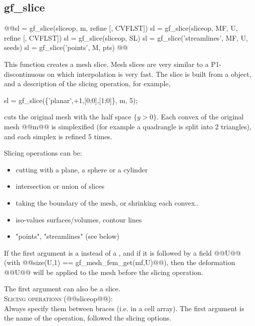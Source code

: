 \subsection{gf\_slice}
\begin{synopsis}
@@sl = gf_slice(sliceop, \tmesh m, \tint refine [, \timat CVFLST])
sl = gf_slice(sliceop, \tmf MF, \tvec U, \tint refine [, \timat CVFLST])
sl = gf_slice(sliceop, \tslc SL)
sl = gf_slice('streamlines', \tmf MF, \tvec U, \tmat seeds)
sl = gf_slice('points', \tmesh M, \tmat pts)
@@\end{synopsis}
\begin{cmddescription}
  This function creates a mesh slice. Mesh slices are very similar to a
  P1-discontinuous \mf on which interpolation is very fast. The
  slice is built from a \mesh object, and a description of the slicing
  operation, for example, 
  \begin{mcode}
sl = gf_slice(\{'planar',+1,[0;0],[1;0]\}, m, 5);
  \end{mcode}
  cuts the original mesh with the half space $\{y>0\}$. Each convex of the
  original mesh @@m@@ is simplexified (for example a quadrangle is
  split into 2 triangles), and each simplex is refined 5 times.

  Slicing operations can be:\begin{itemize}
    \item cutting with a plane, a sphere or a cylinder
    \item intersection or union of slices
    \item taking the boundary of the mesh, or shrinking each convex..
    \item  iso-values surfaces/volumes, contour lines
    \item "points", "streamlines" (see below)
  \end{itemize}

  If the first argument is a \tmf instead of a \mesh, and if it
  is followed by a field @@U@@ (with @@size(U,1) == gf_mesh_fem_get(mf,U)@@),
  then the deformation @@U@@ will be applied to the mesh before the
  slicing operation.

  The first argument can also be a slice.\\[1cm]


  \noindent\textsc{Slicing operations} (@@sliceop@@):\\
  Always specify them between braces (i.e. in a cell array).
  The first argument is the name of the operation, followed the slicing options.


\end{cmddescription}
